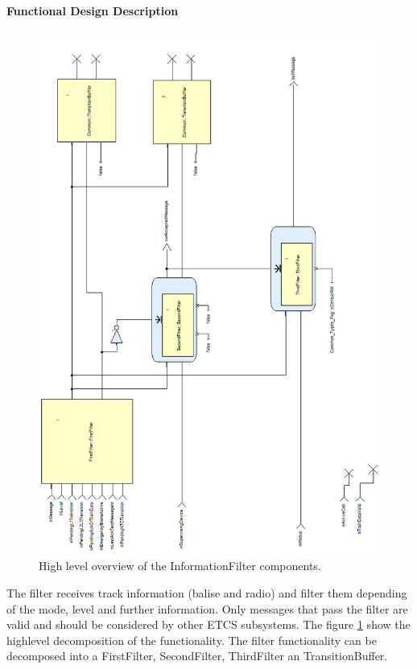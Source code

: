 \paragraph{Functional Design Description}

\begin{figure}[hbtp]
\centering
\includegraphics [scale=0.8]{images/informationfilter-high-level-rot.png}
\caption{High level overview of the InformationFilter components.}
\label{fig:InformationFilterHighLevel}
\end{figure}

The filter receives track information (balise and radio) and filter
them depending of the mode, level and further information. Only
messages that pass the filter are valid and should be considered by
other ETCS subsystems. The figure \ref{fig:InformationFilterHighLevel}
show the high\-level decomposition of the functionality. The filter
functionality can be decomposed into a FirstFilter, SecondFilter,
ThirdFilter an TransitionBuffer.

